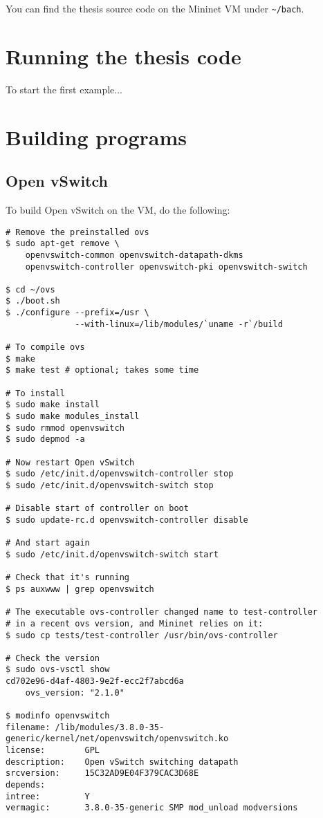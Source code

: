 You can find the thesis source code on the Mininet VM under
\texttt{\~{}/bach}.

\section{Running the thesis code}

To start the first example...

\section{Building programs}

\subsection{Open vSwitch}
To build Open vSwitch on the VM, do the following:

\begin{Verbatim}
# Remove the preinstalled ovs
$ sudo apt-get remove \
    openvswitch-common openvswitch-datapath-dkms
    openvswitch-controller openvswitch-pki openvswitch-switch

$ cd ~/ovs
$ ./boot.sh
$ ./configure --prefix=/usr \
              --with-linux=/lib/modules/`uname -r`/build

# To compile ovs
$ make
$ make test # optional; takes some time

# To install
$ sudo make install
$ sudo make modules_install
$ sudo rmmod openvswitch
$ sudo depmod -a

# Now restart Open vSwitch
$ sudo /etc/init.d/openvswitch-controller stop
$ sudo /etc/init.d/openvswitch-switch stop

# Disable start of controller on boot
$ sudo update-rc.d openvswitch-controller disable

# And start again
$ sudo /etc/init.d/openvswitch-switch start

# Check that it's running
$ ps auxwww | grep openvswitch

# The executable ovs-controller changed name to test-controller
# in a recent ovs version, and Mininet relies on it:
$ sudo cp tests/test-controller /usr/bin/ovs-controller

# Check the version
$ sudo ovs-vsctl show
cd702e96-d4af-4803-9e2f-ecc2f7abcd6a
    ovs_version: "2.1.0"

$ modinfo openvswitch
filename: /lib/modules/3.8.0-35-generic/kernel/net/openvswitch/openvswitch.ko
license:        GPL
description:    Open vSwitch switching datapath
srcversion:     15C32AD9E04F379CAC3D68E
depends:
intree:         Y
vermagic:       3.8.0-35-generic SMP mod_unload modversions
\end{Verbatim}

